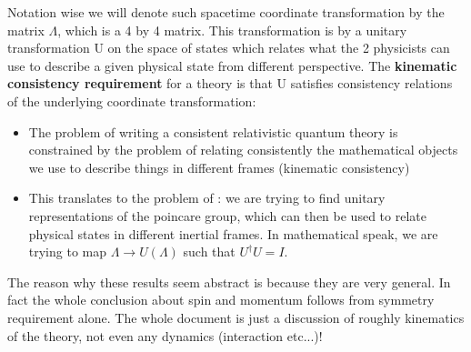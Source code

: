 \documentclass[12pt]{scrartcl}
\begin{document}
Notation wise we will denote such spacetime coordinate transformation by the matrix $\Lambda$, which is a 4 by 4 matrix.  This transformation is  by a unitary transformation U on the space of states which relates what the 2 physicists can use to describe a given physical state from different perspective.  The \textbf{kinematic consistency requirement} for a theory is that U satisfies consistency relations of the underlying coordinate transformation:
\begin{itemize}
\item The problem of writing a consistent relativistic quantum theory is constrained by the problem of relating consistently the mathematical objects we use to describe things in different frames (kinematic consistency)
\item This translates to the problem of : we are trying to find unitary representations of the poincare group, which can then be used to relate physical states in different inertial frames.  In mathematical speak, we are trying to map $\Lambda \rightarrow U(\Lambda)$ such that $U^\dagger U = I$.
\end{itemize}

The reason why these results seem abstract is because they are very general.  In fact the whole conclusion about spin and momentum follows from symmetry requirement alone.  The whole document is just a discussion of roughly kinematics of the theory, not even any dynamics (interaction etc...)!
\end{document}
